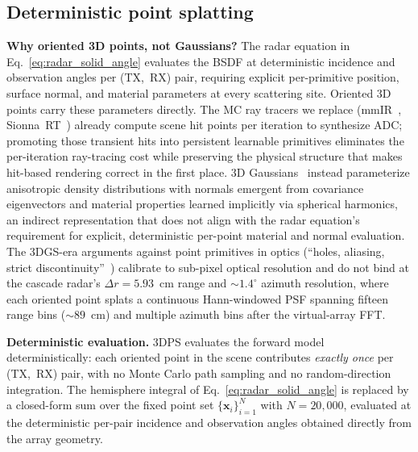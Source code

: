 \subsection{Deterministic point splatting}
\label{sec:methods:splat}

\textbf{Why oriented 3D points, not Gaussians?} The radar equation in Eq.~\eqref{eq:radar_solid_angle} evaluates the BSDF at deterministic incidence and observation angles per (TX,~RX) pair, requiring explicit per-primitive position, surface normal, and material parameters at every scattering site. Oriented 3D points carry these parameters directly. The MC ray tracers we replace (mmIR~\cite{mmIR2026}, Sionna~RT~\cite{sionna}) already compute scene hit points per iteration to synthesize ADC; promoting those transient hits into persistent learnable primitives eliminates the per-iteration ray-tracing cost while preserving the physical structure that makes hit-based rendering correct in the first place. 3D Gaussians~\cite{3dgs} instead parameterize anisotropic density distributions with normals emergent from covariance eigenvectors and material properties learned implicitly via spherical harmonics, an indirect representation that does not align with the radar equation's requirement for explicit, deterministic per-point material and normal evaluation. The 3DGS-era arguments against point primitives in optics (``holes, aliasing, strict discontinuity''~\cite{3dgs}) calibrate to sub-pixel optical resolution and do not bind at the cascade radar's $\Delta r{=}5.93$~cm range and ${\sim}1.4^\circ$ azimuth resolution, where each oriented point splats a continuous Hann-windowed PSF spanning fifteen range bins (${\sim}89$~cm) and multiple azimuth bins after the virtual-array FFT.

\textbf{Deterministic evaluation.} 3DPS evaluates the forward model deterministically: each oriented point in the scene contributes \emph{exactly once} per (TX,~RX) pair, with no Monte Carlo path sampling and no random-direction integration. The hemisphere integral of Eq.~\eqref{eq:radar_solid_angle} is replaced by a closed-form sum over the fixed point set $\{\mathbf{x}_i\}_{i=1}^{N}$ with $N{=}20{,}000$, evaluated at the deterministic per-pair incidence and observation angles obtained directly from the array geometry.

